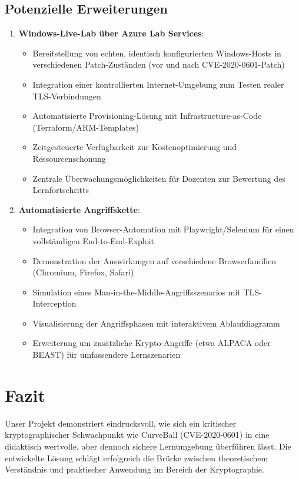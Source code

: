 \documentclass{article}
\begin{document}
\subsection{Potenzielle Erweiterungen}
\begin{enumerate}
  \item \textbf{Windows-Live-Lab über Azure Lab Services}: 
  \begin{itemize}
    \item Bereitstellung von echten, identisch konfigurierten Windows-Hosts in verschiedenen Patch-Zuständen (vor und nach CVE-2020-0601-Patch)
    \item Integration einer kontrollierten Internet-Umgebung zum Testen realer TLS-Verbindungen
    \item Automatisierte Provisioning-Lösung mit Infrastructure-as-Code (Terraform/ARM-Templates)
    \item Zeitgesteuerte Verfügbarkeit zur Kostenoptimierung und Ressourcenschonung
    \item Zentrale Überwachungsmöglichkeiten für Dozenten zur Bewertung des Lernfortschritts
  \end{itemize}
  
  \item \textbf{Automatisierte Angriffskette}: 
  \begin{itemize}
    \item Integration von Browser-Automation mit Playwright/Selenium für einen vollständigen End-to-End-Exploit
    \item Demonstration der Auswirkungen auf verschiedene Browserfamilien (Chromium, Firefox, Safari)
    \item Simulation eines Man-in-the-Middle-Angriffsszenarios mit TLS-Interception
    \item Visualisierung der Angriffsphasen mit interaktivem Ablaufdiagramm
    \item Erweiterung um zusätzliche Krypto-Angriffe (etwa ALPACA oder BEAST) für umfassendere Lernszenarien
  \end{itemize}

\end{enumerate}

\newpage

\section{Fazit}
Unser Projekt demonstriert eindrucksvoll, wie sich ein kritischer kryptographischer Schwachpunkt wie CurveBall (CVE-2020-0601) in eine didaktisch wertvolle, aber dennoch sichere Lernumgebung überführen lässt. Die entwickelte Lösung schlägt erfolgreich die Brücke zwischen theoretischem Verständnis und praktischer Anwendung im Bereich der Kryptographie.
\end{document}
